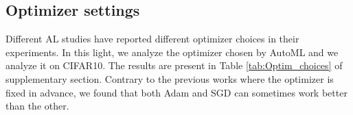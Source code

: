\documentclass[10pt,twocolumn,letterpaper]{article}
\begin{document}
\subsection{Optimizer settings}

Different AL studies have reported different optimizer choices in their experiments. In this light, we analyze the optimizer chosen by AutoML and we analyze it on CIFAR10. The results are present in Table \ref{tab:Optim_choices} of supplementary section. Contrary to the previous works where the optimizer is fixed in advance, we found that both Adam and SGD can sometimes work better than the other.

\begin{table}[h]
\begin{center}
                
                \caption{Analyzing best optimizer chosen by AutoML during random search over 50 trials for all the AL methods (VGG16 classifier) on CIFAR 10. As we implement 7 AL methods in both standard and strongly-regularized settings; so at each AL iteration we have a total of 14 best optimizers chosen.}
                \label{tab:Optim_choices}
                
                
\end{center}
\end{table}
\end{document}
